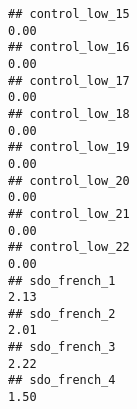 \documentclass[
]{article}
\begin{document}
\begin{verbatim}
## control_low_15                                                                                                                                                                                                                0.00
## control_low_16                                                                                                                                                                                                                0.00
## control_low_17                                                                                                                                                                                                                0.00
## control_low_18                                                                                                                                                                                                                0.00
## control_low_19                                                                                                                                                                                                                0.00
## control_low_20                                                                                                                                                                                                                0.00
## control_low_21                                                                                                                                                                                                                0.00
## control_low_22                                                                                                                                                                                                                0.00
## sdo_french_1                                                                                                                                                                                                                  2.13
## sdo_french_2                                                                                                                                                                                                                  2.01
## sdo_french_3                                                                                                                                                                                                                  2.22
## sdo_french_4                                                                                                                                                                                                                  1.50

\end{verbatim}
\end{document}
